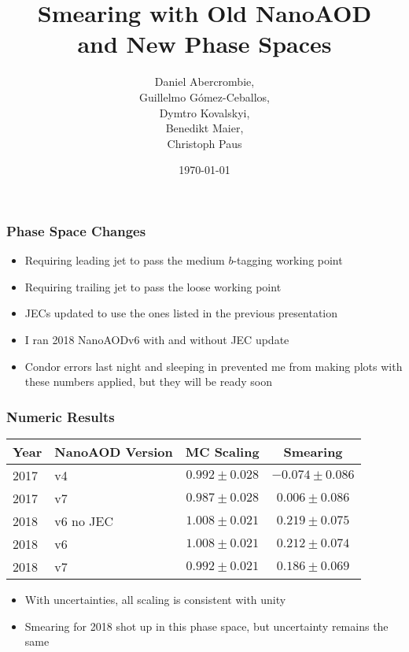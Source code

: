 \documentclass{beamer}
\author[D. Abercrombie]{
  Daniel Abercrombie, \\
  Guillelmo G\'omez-Ceballos, \\
  Dymtro Kovalskyi, \\
  Benedikt Maier, \\
  Christoph Paus
}
\title{\bf \sffamily Smearing with Old NanoAOD \\ and New Phase Spaces}
\date{\today}
\begin{document}
\begin{frame}
  \titlepage
\end{frame}

\begin{frame}
  \frametitle{Phase Space Changes}

  \begin{itemize}
  \item Requiring leading jet to pass the medium $b$-tagging working point
  \item Requiring trailing jet to pass the loose working point
  \item JECs updated to use the ones listed in the previous presentation
  \item I ran 2018 NanoAODv6 with and without JEC update
  \item Condor errors last night and sleeping in prevented me from making plots
    with these numbers applied, but they will be ready soon
  \end{itemize}

\end{frame}

\begin{frame}
  \frametitle{Numeric Results}

  \vfill
  \def\arraystretch{1.5}
  \begin{center}
    \begin{tabular}{|l|l|c|c|}
      \hline
      Year & NanoAOD Version & MC Scaling & Smearing \\
      \hline
      2017 & v4 & $0.992 \pm 0.028$ & $-0.074 \pm 0.086$ \\
      2017 & v7 & $0.987 \pm 0.028$ & $0.006 \pm 0.086$ \\
      2018 & v6 no JEC & $1.008 \pm 0.021$ & $0.219 \pm 0.075$ \\
      2018 & v6 & $1.008 \pm 0.021$ & $0.212 \pm 0.074$ \\
      2018 & v7 & $0.992 \pm 0.021$ & $0.186 \pm 0.069$ \\
      \hline
    \end{tabular}
  \end{center}

  \begin{itemize}
  \item With uncertainties, all scaling is consistent with unity
  \item Smearing for 2018 shot up in this phase space,
    but uncertainty remains the same
  \end{itemize}

\end{frame}
\end{document}
